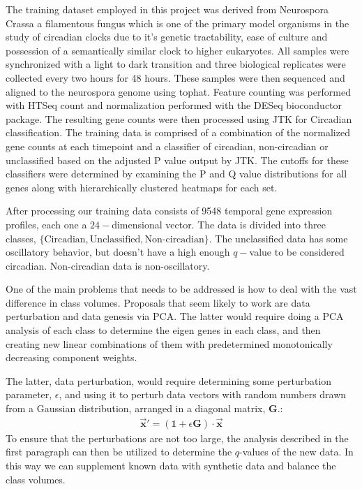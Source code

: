 \documentclass[prl,amsmath,amssymb,floatfix,superscriptaddress,notitlepage,twocolumn]{revtex4}
\newcommand{\ee}[1]{\begin{align} #1 \end{align}} 						%
\newcommand{\vc}[1]{\vec{\mathbf{#1}}} 								%
\begin{document}
The training dataset employed in this project was derived from Neurospora Crassa a filamentous fungus which is one of the primary model organisms in the study of circadian clocks due to it's genetic tractability, ease of culture and possession of a semantically similar clock to higher eukaryotes.  All samples were synchronized with a light to dark transition and three biological replicates were collected every two hours for 48 hours.  These samples were then sequenced and aligned to the neurospora genome using tophat.  Feature counting was performed with HTSeq count and normalization performed with the DESeq bioconductor package.  The resulting gene counts were then processed using JTK for Circadian classification.  The training data is comprised of a combination of the normalized gene counts at each timepoint and a classifier of circadian, non-circadian or unclassified based on the adjusted P value output by JTK. The cutoffs for these classifiers were determined by examining the P and Q value distributions for all genes along with hierarchically clustered heatmaps for each set.

After processing our training data consists of 9548 temporal gene expression profiles, each one a $24-$dimensional vector. The data is divided into three classes, $\{\text{Circadian},\text{Unclassified},\text{Non-circadian}\}$. The unclassified data has some oscillatory behavior, but doesn't have a high enough $q-$value to be considered circadian. Non-circadian data is non-oscillatory. 

One of the main problems that needs to be addressed is how to deal with the vast difference in class volumes. Proposals that seem likely to work are data perturbation and data genesis via PCA. The latter would require doing a PCA analysis of each class to determine the eigen genes in each class, and then creating new linear combinations of them with predetermined monotonically decreasing component weights. 

The latter, data perturbation, would require determining some perturbation parameter, $\epsilon$, and using it to perturb data vectors with random numbers drawn from a Gaussian distribution, arranged in a diagonal matrix, $\textbf{G}$.:
\ee{
\vc{x}' =(\mathbb{1}+\epsilon\textbf{G} )\cdot\vc{x}
} 
To ensure that the perturbations are not too large, the analysis described in the first paragraph can then be utilized to determine the $q$-values of the new data. In this way we can supplement known data with synthetic data and balance the class volumes. 
\end{document}
